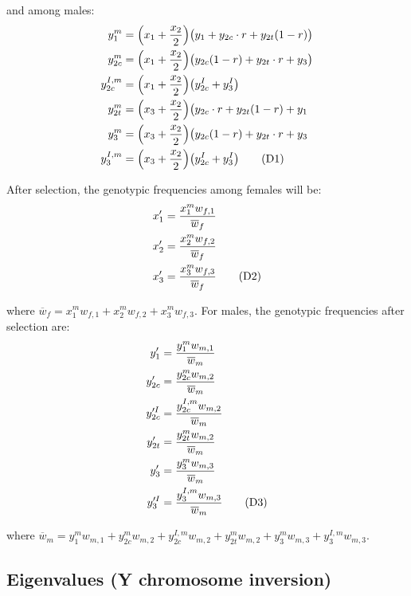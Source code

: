 \documentclass{article}
\newcommand\numberthis{\addtocounter{equation}{1}\tag{\theequation}}
\begin{document}
\noindent and among males:
\begin{align*}
	y^m_{1}      &= \Big( x_1 + \frac{x_2}{2} \Big) \big(y_1 + y_{2c} \cdot r + y_{2t}(1 - r)  \big) \\
	y^m_{2c}     &= \Big( x_1 + \frac{x_2}{2} \Big) \big( y_{2c} (1 - r) + y_{2t} \cdot r + y_3 \big) \\
	y^{I,m}_{2c} &= \Big( x_1 + \frac{x_2}{2} \Big) \big(y^I_{2c} + y^I_{3} \big)  \\
	y^m_{2t}     &= \Big( x_3 + \frac{x_2}{2} \Big) \big( y_{2c} \cdot r + y_{2t}(1 - r) + y_1 \\
	y^m_{3}      &= \Big( x_3 + \frac{x_2}{2} \Big) \big( y_{2c}(1 - r) + y_{2t} \cdot r + y_3 \\
	y^{I,m}_{3}  &= \Big( x_3 + \frac{x_2}{2} \Big) \big(y^I_{2c} + y^I_{3} \big)  \numberthis
\end{align*}

\noindent After selection, the genotypic frequencies among females will be:
\begin{align*}
	x'_{1} &= \frac{x^m_1 w_{f,1}}{\overline{w}_{f}}\\
	x'_{2} &= \frac{x^m_2 w_{f,2}}{\overline{w}_{f}}\\
	x'_{3} &= \frac{x^m_3 w_{f,3}}{\overline{w}_{f}} \numberthis
\end{align*}

\noindent where $\overline{w}_{f} = x^m_1 w_{f,1} + x^m_2 w_{f,2} + x^m_3 w_{f,3}$. For males, the genotypic frequencies after selection are:
\begin{align*}
	y'_{1}       &= \frac{y^m_1 w_{m,1}}{\overline{w}_{m}} \\
	y'_{2c}      &= \frac{y^m_{2c} w_{m,2}}{\overline{w}_{m}} \\
	y'^{I}_{2c}  &= \frac{y^{I,m}_{2c} w_{m,2}}{\overline{w}_{m}}  \\
	y'_{2t}      &= \frac{y^m_{2t} w_{m,2}}{\overline{w}_{m}} \\
	y'_{3}       &= \frac{y^m_3 w_{m,3}}{\overline{w}_{m}} \\
	y'^{I}_{3}   &= \frac{y^{I,m}_3 w_{m,3}}{\overline{w}_{m}} \numberthis
\end{align*}

\noindent where $\overline{w}_{m} = y^m_1 w_{m,1} + y^m_{2c} w_{m,2} + y^{I,m}_{2c} w_{m,2} + y^m_{2t} w_{m,2} + y^m_3 w_{m,3} + y^{I,m}_3 w_{m,3}$.



\subsection{Eigenvalues (Y chromosome inversion)}
\end{document}
